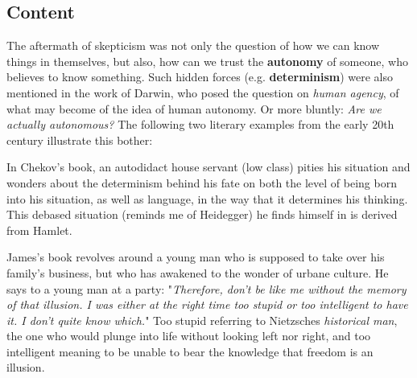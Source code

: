 \documentclass[]{scrartcl}
\begin{document}
\subsection{Content}

\vspace{15pt}



The aftermath of skepticism was not only the question of how we can know things in themselves, but also, how can we trust the \textbf{autonomy} of someone, who believes to know something. Such hidden forces (e.g. \textbf{determinism}) were also mentioned in the work of Darwin, who posed the question on \emph{human agency}, of what may become of the idea of human autonomy. Or more bluntly: \emph{Are we actually autonomous?} The following two literary examples from the early 20th century illustrate this bother:

\begin{description}[leftmargin=!,labelwidth=\widthof{\bfseries The Ambassadors}]
  \item[Cherry Orchard] In Chekov's book, an autodidact house servant (low class) pities his situation and wonders about the determinism behind his fate on both the level of being born into his situation, as well as language, in the way that it determines his thinking. This debased situation (reminds me of Heidegger) he finds himself in is derived from Hamlet.
  \item[The Ambassadors] James's book revolves around a young man who is supposed to take over his family's business, but who has awakened to the wonder of urbane culture. He says to a young man at a party: "\emph{Therefore, don't be like me without the memory of that illusion. I was either at the right time too stupid or too intelligent to have it. I don't quite know which.}" Too stupid referring to Nietzsches \emph{historical man}, the one who would plunge into life without looking left nor right, and too intelligent meaning to be unable to bear the knowledge that freedom is an illusion.
\end{description}
\end{document}
